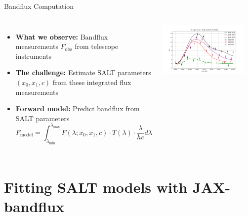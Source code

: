 \documentclass[aspectratio=169]{beamer}
\begin{document}
\begin{frame}{Bandflux Computation}
  \begin{columns}
      \begin{itemize}
        \item \textbf{What we observe:} Bandflux measurements $F_{\text{obs}}$ from telescope instruments
        \item \textbf{The challenge:} Estimate SALT parameters $(x_0, x_1, c)$ from these integrated flux measurements
        \item \textbf{Forward model:} Predict bandflux from SALT parameters
          \begin{equation*}
            F_{\text{model}} = \int_{\lambda_{\text{min}}}^{\lambda_{\text{max}}} F(\lambda; x_0, x_1, c) \cdot T(\lambda) \cdot \frac{\lambda}{hc} d\lambda
          \end{equation*}
      \end{itemize}
      \centering
      \includegraphics[width=0.9\textwidth]{images/sncosmo-fitter.png}
  \end{columns}
\end{frame}


\section{Fitting SALT models with JAX-bandflux}
\end{document}
